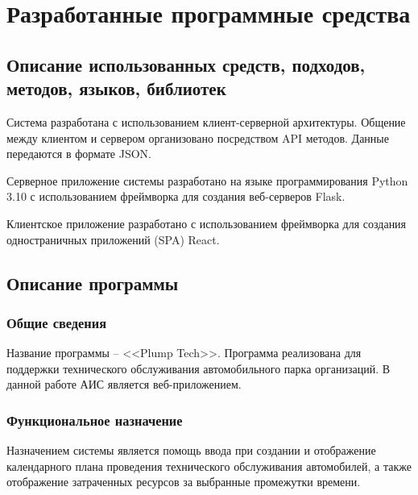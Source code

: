 \documentclass[../nirs.tex]{subfiles}
\begin{document}
    \section{Разработанные программные средства}
    \subsection{Описание использованных средств, подходов, методов, языков,
        библиотек}

    Система разработана с использованием клиент-серверной архитектуры. Общение
    между клиентом и сервером организовано посредством API методов. Данные
    передаются в формате JSON.

    Серверное приложение системы разработано на языке программирования Python
    3.10 с использованием фреймворка для создания веб-серверов Flask.

    Клиентское приложение разработано с использованием фреймворка для создания
    одностраничных приложений (SPA) React.

    \subsection{Описание программы}

    \subsubsection{Общие сведения}

    Название программы -- <<Plump Tech>>. Программа реализована для поддержки
    технического обслуживания автомобильного парка организаций. В данной работе
    АИС является веб-приложением.

    \subsubsection{Функциональное назначение}

    Назначением системы является помощь ввода при создании и отображение
    календарного плана проведения технического обслуживания автомобилей, а
    также отображение затраченных ресурсов за выбранные промежутки времени.
\end{document}
